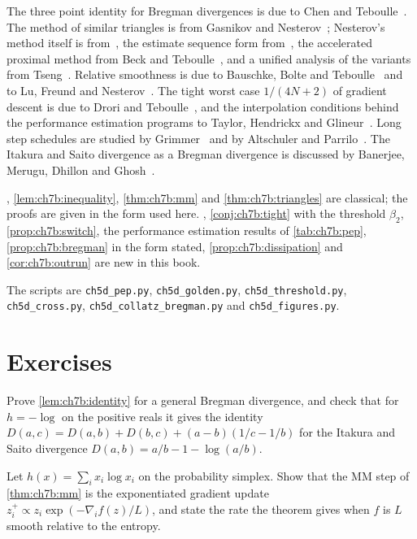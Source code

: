 The three point identity for Bregman divergences is due to Chen and
Teboulle~\cite{chen1993}. The method of similar triangles is from Gasnikov and
Nesterov~\cite{gasnikov2018}; Nesterov's method itself is from~\cite{nesterov1983},
the estimate sequence form from~\cite{nesterov2004}, the accelerated proximal
method from Beck and Teboulle~\cite{beck2009}, and a unified analysis of the
variants from Tseng~\cite{tseng2008}. Relative smoothness is due to Bauschke,
Bolte and Teboulle~\cite{bauschke2017} and to Lu, Freund and Nesterov~\cite{lu2018}.
The tight worst case $1/(4N+2)$ of gradient descent is due to Drori and
Teboulle~\cite{drori2014}, and the interpolation conditions behind the
performance estimation programs to Taylor, Hendrickx and Glineur~\cite{taylor2017}.
Long step schedules are studied by Grimmer~\cite{grimmer2023} and by Altschuler
and Parrilo~\cite{altschuler2024}. The Itakura and Saito divergence as a
Bregman divergence is discussed by Banerjee, Merugu, Dhillon and
Ghosh~\cite{banerjee2005}.

, \cref{lem:ch7b:inequality}, \cref{thm:ch7b:mm} and
\cref{thm:ch7b:triangles} are classical; the proofs are given in the form used
here. , \cref{conj:ch7b:tight} with the threshold
$\beta_2$, \cref{prop:ch7b:switch}, the performance estimation results of
\cref{tab:ch7b:pep}, \cref{prop:ch7b:bregman} in the form stated,
\cref{prop:ch7b:dissipation} and \cref{cor:ch7b:outrun} are new in this book.
\begin{sloppypar}
The scripts are \texttt{ch5d\_pep.py}, \texttt{ch5d\_golden.py},
\texttt{ch5d\_threshold.py}, \texttt{ch5d\_cross.py},
\texttt{ch5d\_collatz\_bregman.py} and \texttt{ch5d\_figures.py}.
\end{sloppypar}

\section*{Exercises}

\begin{exercise}
Prove \cref{lem:ch7b:identity} for a general Bregman divergence, and check that
for $h=-\log$ on the positive reals it gives the identity
$D(a,c)=D(a,b)+D(b,c)+(a-b)(1/c-1/b)$ for the Itakura and Saito divergence
$D(a,b)=a/b-1-\log(a/b)$.
\end{exercise}

\begin{exercise}
Let $h(x)=\sum_ix_i\log x_i$ on the probability simplex. Show that the MM step
of \cref{thm:ch7b:mm} is the exponentiated gradient update
$z^+_i\propto z_i\exp(-\nabla_if(z)/L)$, and state the rate the theorem gives
when $f$ is $L$ smooth relative to the entropy.
\end{exercise}

